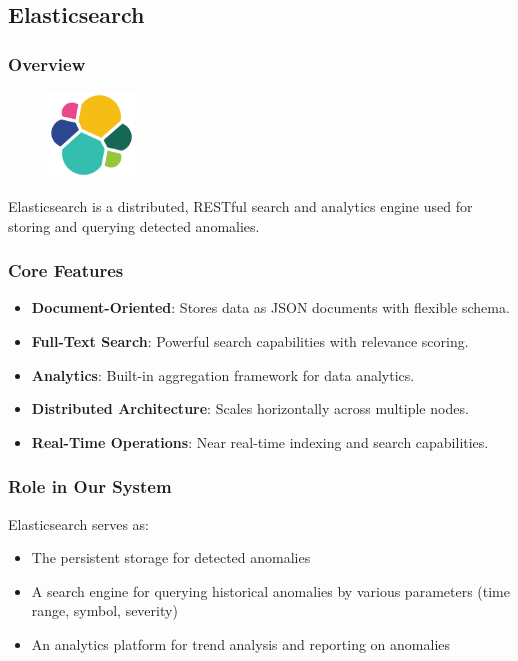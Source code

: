\subsection{Elasticsearch}



\subsubsection{Overview}


\begin{figure}  %
    \vspace{-10pt} %
    \includegraphics[width=2.3cm]{figures/Elasticsearhc.png}
    \vspace{-10pt}
\end{figure}



Elasticsearch is a distributed, RESTful search and analytics engine used for storing and querying detected anomalies.

\subsubsection{Core Features}
\begin{itemize}
    \item \textbf{Document-Oriented}: Stores data as JSON documents with flexible schema.
    \item \textbf{Full-Text Search}: Powerful search capabilities with relevance scoring.
    \item \textbf{Analytics}: Built-in aggregation framework for data analytics.
    \item \textbf{Distributed Architecture}: Scales horizontally across multiple nodes.
    \item \textbf{Real-Time Operations}: Near real-time indexing and search capabilities.
\end{itemize}

\subsubsection{Role in Our System}
Elasticsearch serves as:
\begin{itemize}
    \item The persistent storage for detected anomalies
    \item A search engine for querying historical anomalies by various parameters (time range, symbol, severity)
    \item An analytics platform for trend analysis and reporting on anomalies
\end{itemize}


